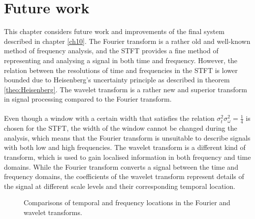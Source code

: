 \chapter{Future work} \label{ch14}
This chapter considers future work and improvements of the final system described in chapter \ref{ch10}. The Fourier transform is a rather old and well-known method of frequency analysis, and the STFT provides a fine method of representing and analysing a signal in both time and frequency. However, the relation between the resolutions of time and frequencies in the STFT is lower bounded due to Heisenberg's uncertainty principle as described in theorem \ref{theo:Heisenberg}. The wavelet transform is a rather new and superior transform in signal processing compared to the Fourier transform.
\\ \\
Even though a window with a certain width that satisfies the relation $\sigma_t^2 \sigma_\omega^2 = \frac{1}{4}$ is chosen for the STFT, the width of the window cannot be changed during the analysis, which means that the Fourier transform is unsuitable to describe signals with both low and high frequencies. The wavelet transform is a different kind of transform, which is used to gain localised information in both frequency and time domains. While the Fourier transform converts a signal between the time and frequency domains, the coefficients of the wavelet transform represent details of the signal at different scale levels and their corresponding temporal location.
\begin{figure}[H]
\hspace*{-0.7cm}
\centering
{}
\caption{Comparisons of temporal and frequency locations in the Fourier and wavelet transforms.}
\label{fig:wave}
\end{figure}

